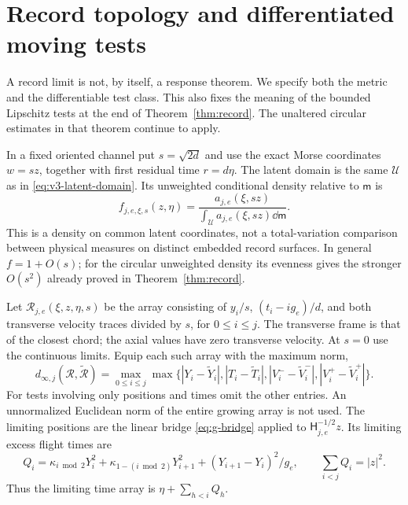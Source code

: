 \section{Record topology and differentiated moving tests}
\label{sec:g-record-response}
A record limit is not, by itself, a response theorem. We specify both the
metric and the differentiable test class. This also fixes the meaning of
the bounded Lipschitz tests at the end of Theorem~\ref{thm:record}.
The unaltered circular estimates in that theorem continue to apply.

In a fixed oriented channel put $s=\sqrt{2d}$ and use the exact Morse
coordinates $w=sz$, together with first residual time $r=d\eta$.
The latent domain is the same $\mathcal U$ as in \eqref{eq:v3-latent-domain}.
Its unweighted conditional density relative to $\mathsf m$ is
\begin{equation}\label{eq:g-latent-density}
 f_{j,e,\xi,s}(z,\eta)=
 \frac{a_{j,e}(\xi,sz)}{\displaystyle\int_{\mathcal U}
                         a_{j,e}(\xi,sz)\dd\mathsf m}.
\end{equation}
This is a density on common latent coordinates, not a total-variation
comparison between physical measures on distinct embedded record surfaces.
In general $f=1+O(s)$; for the circular unweighted density its evenness
gives the stronger $O(s^2)$ already proved in Theorem~\ref{thm:record}.

Let $\mathcal R_{j,e}(\xi,z,\eta,s)$ be the array consisting of
$y_i/s$, $(t_i-ig_e)/d$, and both transverse velocity traces divided
by $s$, for $0\le i\le j$. The transverse frame is that of the closest
chord; the axial values have zero transverse velocity. At $s=0$ use
the continuous limits. Equip each such array with the maximum norm,
\begin{equation}\label{eq:g-record-metric}
 d_{\infty,j}(\mathcal R,\widetilde{\mathcal R})
 =\max_{0\le i\le j}
    \max\{|Y_i-\widetilde Y_i|,|T_i-\widetilde T_i|,
          |V_i^--\widetilde V_i^-|,|V_i^+-\widetilde V_i^+|\}.
\end{equation}
For tests involving only positions and times omit the other entries.
An unnormalized Euclidean norm of the entire growing array is not used.
The limiting positions are the linear bridge \eqref{eq:g-bridge} applied
to $\mathsf H_{j,e}^{-1/2}z$. Its limiting excess flight times are
\[
 Q_i=\kappa_{i\bmod2}Y_i^2+\kappa_{1-(i\bmod2)}Y_{i+1}^2
                          +(Y_{i+1}-Y_i)^2/g_e,
 \qquad \sum_{i<j}Q_i=|z|^2.
\]
Thus the limiting time array is $\eta+\sum_{h<i}Q_h$.

